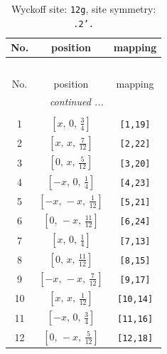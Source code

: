 \documentclass[fleqn,8pt]{jsarticle}
\begin{document}
\begin{longtable}{ccc}
\caption{Wyckoff site: {\tt 12g}, site symmetry: {\tt .2'.}}
 \\
 \hline \hline
No. & position & mapping \\ \hline \endfirsthead

\multicolumn{2}{l}{\tablename\ \thetable{}} \\
 \hline \hline
No. & position & mapping \\ \hline \endhead

 \hline \hline
\multicolumn{2}{r}{\footnotesize\it continued ...} \\ \endfoot

 \hline \hline
\multicolumn{2}{r}{} \\ \endlastfoot

1 & $\left[ x,\, 0,\, \frac{3}{4} \right]$ & {\tt [1,19]} \\ \hline
2 & $\left[ x,\, x,\, \frac{7}{12} \right]$ & {\tt [2,22]} \\ \hline
3 & $\left[ 0,\, x,\, \frac{5}{12} \right]$ & {\tt [3,20]} \\ \hline
4 & $\left[ - x,\, 0,\, \frac{1}{4} \right]$ & {\tt [4,23]} \\ \hline
5 & $\left[ - x,\, - x,\, \frac{1}{12} \right]$ & {\tt [5,21]} \\ \hline
6 & $\left[ 0,\, - x,\, \frac{11}{12} \right]$ & {\tt [6,24]} \\ \hline
7 & $\left[ x,\, 0,\, \frac{1}{4} \right]$ & {\tt [7,13]} \\ \hline
8 & $\left[ 0,\, x,\, \frac{11}{12} \right]$ & {\tt [8,15]} \\ \hline
9 & $\left[ - x,\, - x,\, \frac{7}{12} \right]$ & {\tt [9,17]} \\ \hline
10 & $\left[ x,\, x,\, \frac{1}{12} \right]$ & {\tt [10,14]} \\ \hline
11 & $\left[ - x,\, 0,\, \frac{3}{4} \right]$ & {\tt [11,16]} \\ \hline
12 & $\left[ 0,\, - x,\, \frac{5}{12} \right]$ & {\tt [12,18]} \\
\end{longtable}
\renewcommand{\arraystretch}{1.2}
\end{document}

